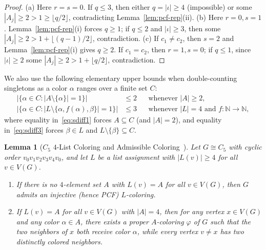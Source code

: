 \documentclass[11pt,a4paper]{article}
\newtheorem{lemma}[theorem]{Lemma}
\theoremstyle{definition}
\newcommand{\N}{\mathbb{N}}
\begin{document}
\begin{proof}
(a) Here $r = s = 0$. If $q \le 3$, then either $q = |\iota| \ge 4$ (impossible) or some $|A_j| \ge 2 > 1 \ge \lfloor q/2 \rfloor$, contradicting Lemma~\ref{lem:pcf-rep}(ii).
(b) Here $r = 0, s = 1$. Lemma~\ref{lem:pcf-rep}(i) forces $q \ge 1$; if $q \le 2$ and $|\iota| \ge 3$, then some $|A_j| \ge 2 > 1 + \lfloor (q-1)/2 \rfloor$, contradiction.
(c) If $c_1 \neq c_2$, then $s = 2$ and Lemma~\ref{lem:pcf-rep}(i) gives $q \ge 2$. If $c_1 = c_2$, then $r = 1, s = 0$; if $q \le 1$, since $|\iota| \ge 2$ some $|A_j| \ge 2 > 1 + \lfloor q/2 \rfloor$, contradiction.
\end{proof}

We also use the following elementary upper bounds when double-counting singletons as a color $\alpha$ ranges over a finite set $C$:
\begin{align}
  \bigl|\{\alpha \in C : |A \setminus \{\alpha\}| = 1\}\bigr| &\le 2 && \text{whenever } |A| \ge 2, \label{eq:sdiff1} \\
  \bigl|\{\alpha \in C : |L \setminus \{\alpha, f(\alpha), \beta\}| = 1\}\bigr| &\le 3 && \text{whenever } |L| = 4 \text{ and } f : \N \to \N, \label{eq:sdiff3}
\end{align}
where equality in~\eqref{eq:sdiff1} forces $A \subseteq C$ (and $|A| = 2$), and equality in~\eqref{eq:sdiff3} forces $\beta \in L$ and $L \setminus \{\beta\} \subseteq C$.

\begin{lemma}[$C_5$ $4$-List Coloring and Admissible Coloring~\cite{LuYingSong2026}]\label{lem:c5}
Let $G \cong C_5$ with cyclic order $v_0 v_1 v_2 v_3 v_4 v_0$, and let $L$ be a list assignment with $|L(v)| \ge 4$ for all $v \in V(G)$.
\begin{enumerate}[label=(\alph*),leftmargin=*,itemsep=1pt]
  \item If there is no $4$-element set $A$ with $L(v) = A$ for all $v \in V(G)$, then $G$ admits an injective (hence PCF) $L$-coloring.
  \item If $L(v) = A$ for all $v \in V(G)$ with $|A| = 4$, then for any vertex $x \in V(G)$ and any color $\alpha \in A$, there exists a proper $A$-coloring $\varphi$ of $G$ such that the two neighbors of $x$ both receive color $\alpha$, while every vertex $v \neq x$ has two distinctly colored neighbors.
\end{enumerate}
\end{lemma}
\end{document}
